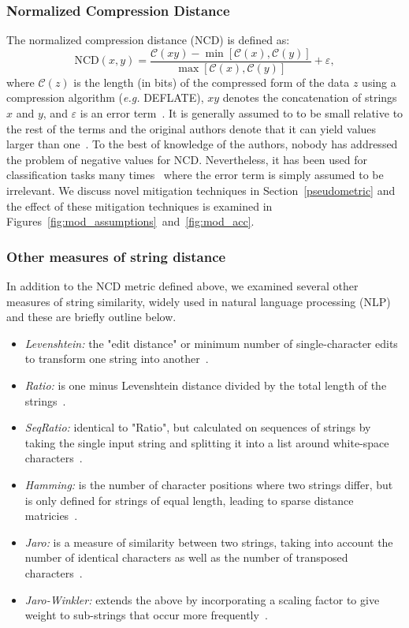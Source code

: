 \documentclass[conference]{IEEEtran}
\begin{document}
\subsubsection{Normalized Compression Distance}
\label{ncd}
The normalized compression distance (NCD) is defined as:
\begin{equation}
    \text{NCD}(x, y) = \frac{\mathcal{C}(xy) - \min[\mathcal{C}(x), \mathcal{C}(y)]}{\max[\mathcal{C}(x), \mathcal{C}(y)]} + \varepsilon,
\end{equation}
where $\mathcal{C}(z)$ is the length (in bits) of the compressed form of the data $z$ using a compression algorithm (\textit{e.g.} DEFLATE), $xy$ denotes the concatenation of strings $x$ and $y$, and $\varepsilon$ is an error term~\cite{ncd}. It is generally assumed to to be small relative to the rest of the terms and the original authors denote that it can yield values larger than one~\cite{ncd}. To the best of knowledge of the authors, nobody has addressed the problem of negative values for NCD\@.
Nevertheless, it has been used for classification tasks many times~\cite{opitz2023gzip,weinreich2023parameter,nishida2011tweet,jiang2022less} where the error term is simply assumed to be irrelevant. 
We discuss novel mitigation techniques in Section~\ref{pseudometric} and the effect of these mitigation techniques is examined in Figures~\ref{fig:mod_assumptions}~and~\ref{fig:mod_acc}.

\subsubsection{Other measures of string distance}
\label{string_metrics}
In addition to the NCD metric defined above, we examined several other measures of string similarity, widely used in natural language processing (NLP) and these are briefly outline below. 
\begin{itemize}
    \item \textit{Levenshtein:} the "edit distance" or minimum number of single-character edits to transform one string into another~\cite{navarro2001guided}.
    \item \textit{Ratio:} is one minus Levenshtein distance divided by the total length of the strings~\cite{levenshtein}.
    \item \textit{SeqRatio:} identical to "Ratio", but calculated on sequences of strings by taking the single input string and splitting it into a list around white-space characters~\cite{levenshtein}.
    \item \textit{Hamming:} is the number of character positions where two strings differ, but is only defined for strings of equal length, leading to sparse distance matricies~\cite{hamming_distance}.
    \item \textit{Jaro:} is a measure of similarity between two strings, taking into account the number of identical characters as well as the number of transposed characters~\cite{jaro}.
    \item \textit{Jaro-Winkler:} extends the above by incorporating a scaling factor to give weight to sub-strings that occur more frequently~\cite{jaro}. 
\end{itemize}
\end{document}
